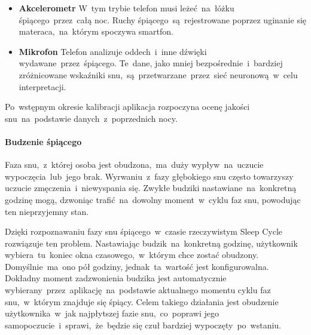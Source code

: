 \begin{itemize}
	\item {\bf Akcelerometr} W~tym trybie telefon musi leżeć~na~łóżku śpiącego~przez~całą noc. Ruchy śpiącego~są~rejestrowane poprzez uginanie się materaca,~na~którym spoczywa smartfon.
	\item {\bf Mikrofon} Telefon analizuje oddech~i~inne dźwięki wydawane~przez~śpiącego. Te~dane, jako mniej bezpośrednie~i~bardziej zróżnicowane wskaźniki snu,~są~przetwarzane~przez~sieć neuronową~w~celu interpretacji.
\end{itemize}

Po~wstępnym okresie kalibracji aplikacja rozpoczyna ocenę jakości snu~na~podstawie danych~z~poprzednich nocy.

\bigskip
{}

\paragraph{Budzenie śpiącego}
Faza snu,~z~której osoba jest obudzona,~ma~duży wypływ~na~uczucie wypoczęcia~lub~jego brak. Wyrwaniu~z~fazy głębokiego snu często towarzyszy uczucie zmęczenia~i~niewyspania się. Zwykłe budziki nastawiane~na~konkretną godzinę mogą, dzwoniąc trafić~na~dowolny moment~w~cyklu faz snu, powodując ten nieprzyjemny stan. 

Dzięki rozpoznawaniu fazy snu śpiącego~w~czasie rzeczywistym Sleep Cycle rozwiązuje ten problem. Nastawiając budzik~na~konkretną godzinę, użytkownik wybiera~tu~koniec okna czasowego,~w~którym chce zostać obudzony. Domyślnie~ma~ono pół godziny, jednak~ta~wartość jest konfigurowalna. Dokładny moment zadzwonienia budzika jest automatycznie wybierany~przez~aplikację~na~podstawie aktualnego momentu cyklu faz snu,~w~którym znajduje się śpiący. Celem takiego działania jest obudzenie użytkownika~w~jak najpłytszej fazie snu,~co~poprawi jego samopoczucie~i~sprawi,~że~będzie się czuł bardziej wypoczęty~po~wstaniu.
